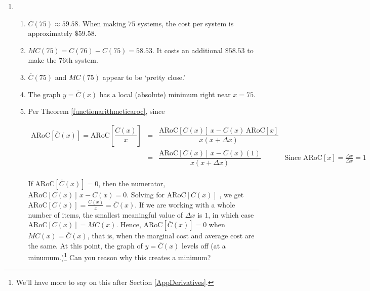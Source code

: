 \begin{enumerate}
\begin{enumerate}
\end{enumerate}

\item \begin{enumerate}  \item $\overline{C}(75) \approx 59.58$.  When making $75$ systems, the cost per system is approximately $\$ 59.58$.

\item $MC(75) = C(76) - C(75) = 58.53$.  It costs an additional $\$ 58.53$ to make the $76$th system.

\item  $\overline{C}(75)$ and $MC(75)$ appear to be `pretty close.'

\item  The graph $y = \overline{C}(x)$  has a local (absolute) minimum right near $x = 75$.

\item  Per Theorem \ref{functionarithmeticaroc}, since 

  \[ \begin{array}{lcrl}
  
  \text{ARoC}[ \overline{C}(x)] = \text{ARoC}\left[\dfrac{C(x)}{x}   \right] & = & \dfrac{ \text{ARoC}[C(x)] \,  x  - C(x)  \, \text{ARoC}[x]}{x (x + \Delta x)} & \\[10pt]  
   & = & \dfrac{ \text{ARoC}[C(x)] \,  x  - C(x)(1) }{x (x +\Delta x)} & \text{Since $\text{ARoC}[x] = \frac{\Delta x}{ \Delta x} = 1$}\\[10pt]  \end{array}\]

If $\text{ARoC}[ \overline{C}(x)]  = 0$, then the numerator,  $\text{ARoC}[C(x)] \,  x  - C(x) = 0$.  Solving for $\text{ARoC}[C(x)]$ , we get  $\text{ARoC}[C(x)] = \frac{C(x)}{x} = \overline{C}(x)$.  If we are working with a whole number of items, the smallest meaningful value of $\Delta x$ is $1$, in which case $\text{ARoC}[C(x)]  = MC(x)$.  Hence,  $\text{ARoC}[ \overline{C}(x)] = 0$ when $MC(x) = \overline{C}(x)$, that is, when  the marginal cost and average cost are the same.  At this point, the graph of $y = \overline{C}(x)$ levels off (at a minumum.)\footnote{We'll have more to say on this after Section \ref{AppDerivatives}.} Can you reason why this creates a minimum?



\setcounter{HW}{\value{enumi}}

\end{enumerate}

\setcounter{HW}{\value{enumi}}
\end{enumerate}





